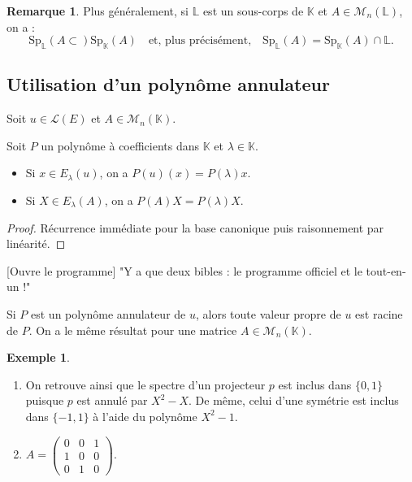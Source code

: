 \documentclass[french]{article}
\newcommand{\K}{\mathbb{K}}
\renewcommand{\L}{\mathbb{L}}
\newcommand{\Sp}{\text{Sp}}
\theoremstyle{plain}
\theoremstyle{definition}
\newtheorem*{ex}{Exemple}
\newtheorem*{rmq}{Remarque}
\theoremstyle{remark}
\begin{document}
	\begin{rmq}
		Plus généralement, si $\L$ est un sous-corps de $\K$ et $A\in\mathcal{M}_n(\L)$, on a : $$\Sp_\L(A\subset)\Sp_\K(A)\quad\text{et, plus précisément,}\quad\Sp_\L(A)=\Sp_\K(A)\cap\L.$$
	\end{rmq}
	
	\subsection{Utilisation d'un polynôme annulateur}
	
	Soit $u\in\mathcal{L}(E)$ et $A\in\mathcal{M}_n(\K)$.
	
	\begin{prop}
		Soit $P$ un polynôme à coefficients dans $\K$ et $\lambda\in\K$.
		\begin{itemize}
			\item Si $x\in E_\lambda(u)$, on a $P(u)(x)=P(\lambda)x$.
			\item Si $X\in E_\lambda(A)$, on a $P(A)X=P(\lambda)X$.
		\end{itemize}
	\end{prop}
	\begin{proof}
		Récurrence immédiate pour la base canonique puis raisonnement par linéarité.
	\end{proof}
	
	[Ouvre le programme] "Y a que deux bibles : le programme officiel et le tout-en-un !"
	
	\begin{prop}%
		Si $P$ est un polynôme annulateur de $u$, alors toute valeur propre de $u$ est racine de $P$. On a le même résultat pour une matrice $A\in\mathcal{M}_n(\K)$.
	\end{prop}%
	
	\begin{ex}
		\begin{enumerate}
			\item On retrouve ainsi que le spectre d'un projecteur $p$ est inclus dans $\{0,1\}$ puisque $p$ est annulé par $X^2-X$. De même, celui d'une symétrie est inclus dans $\{-1,1\}$ à l'aide du polynôme $X^2-1$.
			\item $A=\displaystyle\begin{pmatrix}
				0&0&1\\
				1&0&0\\
				0&1&0
			\end{pmatrix}.$
		\end{enumerate}
	\end{ex}
	
\end{document}

